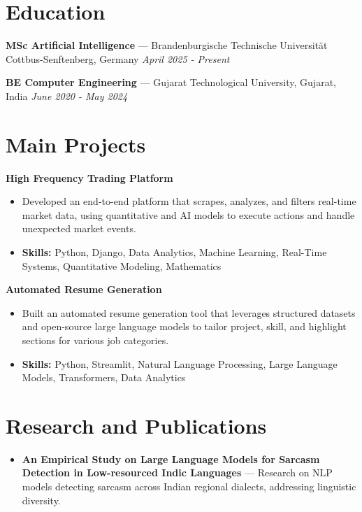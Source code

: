 \documentclass[a4paper,10pt]{article}
\begin{document}
\section*{Education}
\textbf{MSc Artificial Intelligence} — Brandenburgische Technische Universität Cottbus-Senftenberg, Germany \hfill \textit{April 2025 - Present}\par
\vspace{1.5pt}
\textbf{BE Computer Engineering} — Gujarat Technological University, Gujarat, India \hfill \textit{June 2020 - May 2024}\par

\section*{Main Projects}
\textbf{High Frequency Trading Platform}\par
\vspace{1pt}
\begin{itemize}
  \item Developed an end-to-end platform that scrapes, analyzes, and filters real-time market data, using quantitative and AI models to execute actions and handle unexpected market events.
  \item \textbf{Skills:} Python, Django, Data Analytics, Machine Learning, Real-Time Systems, Quantitative Modeling, Mathematics
\end{itemize}
\vspace{3pt}
\textbf{Automated Resume Generation}\par
\vspace{1pt}
\begin{itemize}
  \item Built an automated resume generation tool that leverages structured datasets and open-source large language models to tailor project, skill, and highlight sections for various job categories.
  \item \textbf{Skills:} Python, Streamlit, Natural Language Processing, Large Language Models, Transformers, Data Analytics
\end{itemize}

\section*{Research and Publications}
\begin{itemize}
\item \textbf{An Empirical Study on Large Language Models for Sarcasm Detection in Low-resourced Indic Languages} — Research on NLP models detecting sarcasm across Indian regional dialects, addressing linguistic diversity.
\end{itemize}
\end{document}
